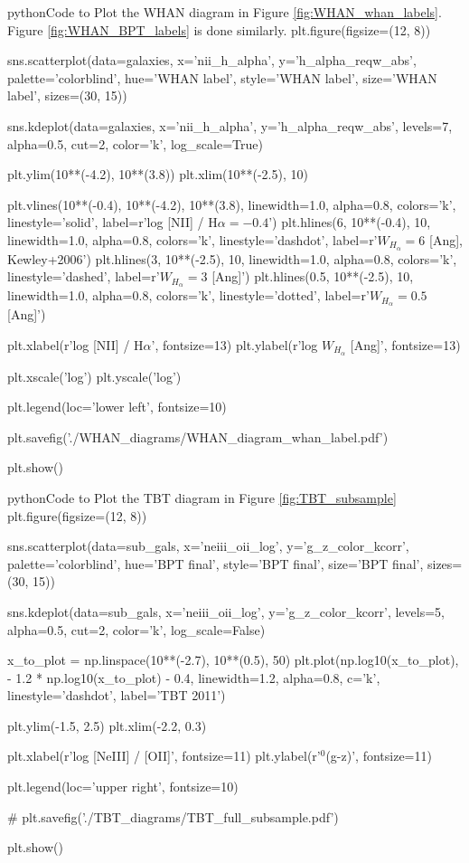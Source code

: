 \documentclass[letterpaper, oneside]{article}
\begin{document}
		
	\begin{sourcecode}[\label{whan_plot}]{python}{Code to Plot the WHAN diagram in Figure \ref{fig:WHAN_whan_labels}. Figure \ref{fig:WHAN_BPT_labels} is done similarly.}
	plt.figure(figsize=(12, 8))
	
	sns.scatterplot(data=galaxies, x='nii_h_alpha', y='h_alpha_reqw_abs', palette='colorblind', 
	hue='WHAN label', style='WHAN label', size='WHAN label', sizes=(30, 15))
	
	sns.kdeplot(data=galaxies, x='nii_h_alpha', y='h_alpha_reqw_abs', levels=7, 
	alpha=0.5, cut=2, color='k', log_scale=True)
	
	plt.ylim(10**(-4.2), 10**(3.8))
	plt.xlim(10**(-2.5), 10)
	
	plt.vlines(10**(-0.4), 10**(-4.2), 10**(3.8), linewidth=1.0, alpha=0.8, colors='k', linestyle='solid', 
	label=r'log [NII] / H$\alpha = -0.4$')
	plt.hlines(6, 10**(-0.4), 10, linewidth=1.0, alpha=0.8, colors='k', linestyle='dashdot', 
	label=r'$W_{H_{\alpha}} = 6$ [Ang], Kewley+2006')
	plt.hlines(3, 10**(-2.5), 10, linewidth=1.0, alpha=0.8, colors='k', linestyle='dashed', 
	label=r'$W_{H_{\alpha}} = 3$ [Ang]')
	plt.hlines(0.5, 10**(-2.5), 10, linewidth=1.0, alpha=0.8, colors='k', linestyle='dotted', 
	label=r'$W_{H_{\alpha}} = 0.5$ [Ang]')
	
	plt.xlabel(r'log [NII] / H$\alpha$', fontsize=13)
	plt.ylabel(r'log $W_{H_{\alpha}}$ [Ang]', fontsize=13)
	
	plt.xscale('log')
	plt.yscale('log')
	
	plt.legend(loc='lower left', fontsize=10)
	
	plt.savefig('./WHAN_diagrams/WHAN_diagram_whan_label.pdf')
	
	plt.show()
	\end{sourcecode}


	\begin{sourcecode}[\label{tbt_plot}]{python}{Code to Plot the TBT diagram in Figure \ref{fig:TBT_subsample}}
	plt.figure(figsize=(12, 8))
	
	sns.scatterplot(data=sub_gals, x='neiii_oii_log', y='g_z_color_kcorr', palette='colorblind', 
	hue='BPT final', style='BPT final', size='BPT final', sizes=(30, 15))
	
	sns.kdeplot(data=sub_gals, x='neiii_oii_log', y='g_z_color_kcorr', levels=5, 
	alpha=0.5, cut=2, color='k', log_scale=False)
	
	x_to_plot = np.linspace(10**(-2.7), 10**(0.5), 50)
	plt.plot(np.log10(x_to_plot), - 1.2 * np.log10(x_to_plot) - 0.4, 
	linewidth=1.2, alpha=0.8, c='k', linestyle='dashdot', label='TBT 2011')
	
	plt.ylim(-1.5, 2.5)
	plt.xlim(-2.2, 0.3)
	
	plt.xlabel(r'log [NeIII] / [OII]', fontsize=11)
	plt.ylabel(r'$^0$(g-z)', fontsize=11)
	
	plt.legend(loc='upper right', fontsize=10)
	
	# plt.savefig('./TBT_diagrams/TBT_full_subsample.pdf')
	
	plt.show()
	\end{sourcecode}
\end{document}
